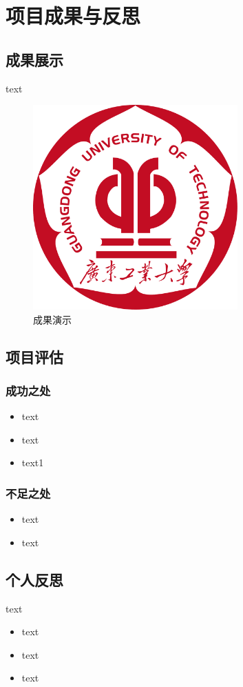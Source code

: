 
\section{项目成果与反思}

\subsection{成果展示}
text
\begin{figure}[h]
    \centering
    \includegraphics[width=0.7\textwidth]{figures/logo.pdf}
    \caption{成果演示}
\end{figure}
\subsection{项目评估}

\subsubsection{成功之处}

\begin{itemize}
    \item text
    \item text
    \item text1
\end{itemize}

\subsubsection{不足之处}
\begin{itemize}
    \item text
    \item text
\end{itemize}

\subsection{个人反思}
text
\begin{itemize}
    \item text
    \item text
    \item text
\end{itemize}

